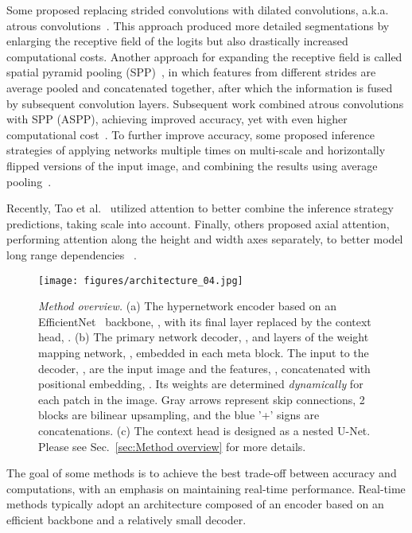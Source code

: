 \documentclass[final]{cvpr}
\newcommand{\minisection}[1]{\vspace{2mm}\noindent{\textbf{#1}.}}
\begin{document}
Some proposed replacing strided convolutions with dilated convolutions, a.k.a. atrous convolutions~\cite{chen2017deeplab,yu2015multi}. This approach produced more detailed segmentations by enlarging the receptive field of the logits but also drastically increased computational costs. Another approach for expanding the receptive field is called spatial pyramid pooling (SPP)~\cite{he2015spatial,zhao2017pyramid}, in which features from different strides are average pooled and concatenated together, after which the information is fused by subsequent convolution layers. Subsequent work combined atrous convolutions with SPP (ASPP), achieving improved accuracy, yet with even higher computational cost~\cite{chen2017deeplab,chen2017rethinking,chen2018encoder}. To further improve accuracy, some proposed inference strategies of applying networks multiple times on multi-scale and horizontally flipped versions of the input image, and combining the results using average pooling~\cite{chen2017rethinking,chen2018encoder}.

Recently, Tao et al.~\cite{tao2020hierarchical} utilized attention to better combine the inference strategy predictions, taking scale into account. Finally, others proposed axial attention, performing attention along the height and width axes separately, to better model long range dependencies~\cite{ho2019axial,wang2020axial} .

\begin{figure*}[t]
\centering
\texttt{[image: figures/architecture\_04.jpg]}\vspace{-2mm}
\caption{\emph{Method overview.} (a) The hypernetwork encoder based on an EfficientNet~\cite{tan2019efficientnet} backbone, , with its final layer replaced by the context head, . (b) The primary network decoder, , and layers  of the weight mapping network, , embedded in each meta block. The input to the decoder, , are the input image and the features, , concatenated with positional embedding, . Its weights are determined {\em dynamically} for each patch in the image. Gray arrows represent skip connections, 2 blocks are bilinear upsampling, and the blue '+' signs are concatenations. (c) The context head is designed as a nested U-Net. Please see Sec.~\ref{sec:Method overview} for more details.}
\vspace{-2mm}
\label{fig:architecture}
\end{figure*}

\minisection{Real-time segmentation}
The goal of some methods is to achieve the best trade-off between accuracy and computations, with an emphasis on maintaining real-time performance. Real-time methods typically adopt an architecture composed of an encoder based on an efficient backbone and a relatively small decoder.
\end{document}

